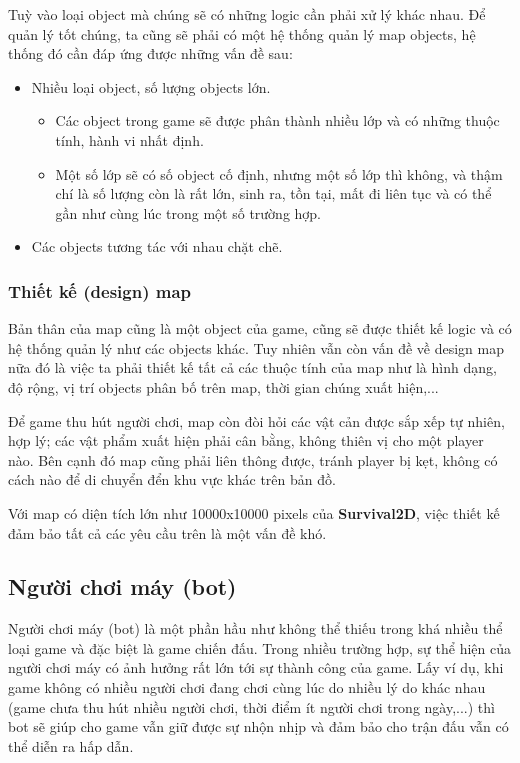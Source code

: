 \documentclass[12pt,a4paper]{article}
\begin{document}
  Tuỳ vào loại object mà chúng sẽ có những logic cần phải xử lý khác nhau. Để quản lý tốt chúng, ta cũng sẽ phải có một hệ thống quản lý map objects, hệ thống đó cần đáp ứng được những vấn đề sau:
  \begin{itemize}
      \item Nhiều loại object, số lượng objects lớn.
      \begin{itemize}
          \item Các object trong game sẽ được phân thành nhiều lớp và có những thuộc tính, hành vi nhất định.
          \item Một số lớp sẽ có số object cố định, nhưng một số lớp thì không, và thậm chí là số lượng còn là rất lớn, sinh ra, tồn tại, mất đi liên tục và có thể gần như cùng lúc trong một số trường hợp.
      \end{itemize}
      \item Các objects tương tác với nhau chặt chẽ.
  \end{itemize}
  
  \subsubsection{Thiết kế (design) map}
  Bản thân của map cũng là một object của game, cũng sẽ được thiết kế logic và có hệ thống quản lý như các objects khác. Tuy nhiên vẫn còn vấn đề về design map nữa đó là việc ta phải thiết kế tất cả các thuộc tính của map như là hình dạng, độ rộng, vị trí objects phân bố trên map, thời gian chúng xuất hiện,...
  
  Để game thu hút người chơi, map còn đòi hỏi các vật cản được sắp xếp tự nhiên, hợp lý; các vật phẩm xuất hiện phải cân bằng, không thiên vị cho một player nào. Bên cạnh đó map cũng phải liên thông được, tránh player bị kẹt, không có cách nào để di chuyển đển khu vực khác trên bản đồ.
  
  Với map có diện tích lớn như 10000x10000 pixels của \textbf{Survival2D}, việc thiết kế đảm bảo tất cả các yêu cầu trên là một vấn đề khó.
  
  \subsection{Người chơi máy (bot)}
  Người chơi máy (bot) là một phần hầu như không thể thiếu trong khá nhiều thể loại game và đặc biệt là game chiến đấu. Trong nhiều trường hợp, sự thể hiện của người chơi máy có ảnh hưởng rất lớn tới sự thành công của game. Lấy ví dụ, khi game không có nhiều người chơi đang chơi cùng lúc do nhiều lý do khác nhau (game chưa thu hút nhiều người chơi, thời điểm ít người chơi trong ngày,...) thì bot sẽ giúp cho game vẫn giữ được sự nhộn nhịp và đảm bảo cho trận đấu vẫn có thể diễn ra hấp dẫn.
  
\end{document}
